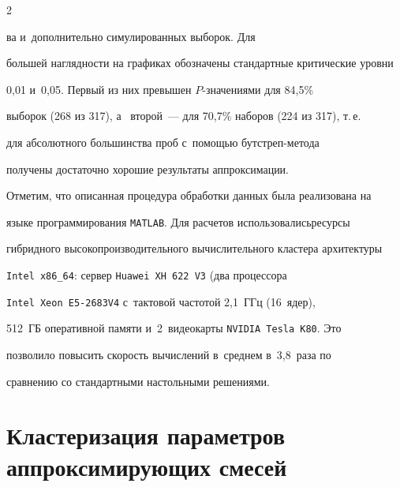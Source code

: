 \begin{multicols}{2}





\noindent


ва и~дополнительно симулированных выборок. Для 


большей наглядности на графиках обозначены стандартные критические уровни 


0{,}01 и~0{,}05. Первый из них превышен $P$-зна\-че\-ни\-ями для 84{,}5\% 


выборок (268 из 317), а~ второй~--- для 70{,}7\% наборов (224 из 317), т.\,е.\


 для абсолютного большинства проб с~помощью бут\-стреп-ме\-то\-да 


получены достаточно хорошие результаты аппроксимации.











Отметим, что описанная процедура обработки данных была реализована на 


языке про\-грам\-ми\-ро\-ва\-ния \verb"MATLAB". Для расчетов использовались\linebreak ресурсы 


гибридного высокопроизводительного вычислительного кластера архитектуры 


\verb"Intel x86_64": сервер \verb"Huawei XH 622 V3" (два процессора 


\verb"Intel Xeon E5-2683V4" с~тактовой частотой 2{,}1~ГГц (16~ядер), 


512~ГБ оперативной памяти и~2~видеокарты \verb"NVIDIA Tesla K80". Это 


позволило повысить скорость вычислений в~среднем в~3{,}8~раза по 


сравнению со стандартными настольными решениями.








\section{Кластеризация параметров аппроксимирующих смесей}





\vspace*{-12pt}






\end{multicols}
